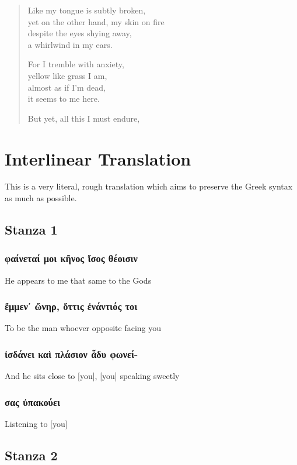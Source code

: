 \begin{multicols}{2}
\begin{verse}
  Like my tongue is subtly broken, \\
  yet on the other hand, my skin on fire \\
  despite the eyes shying away, \\
  a whirlwind in my ears. \\
  \medskip

  For I tremble with anxiety, \\
  yellow like grass I am, \\
  almost as if I'm dead, \\
  it seems to me here. \\
  \medskip

  But yet, all this I must endure,

\end{verse}
\end{multicols}
\clearpage
\section*{Interlinear Translation}
This is a very literal, rough translation which aims to preserve the Greek syntax as much as possible.

\subsection*{Stanza 1}
\subsubsection*{φαίνεταί μοι κῆνος ἴσος θέοισιν}
He appears to me that same to the Gods

\subsubsection*{ἔμμεν᾽ ὤνηρ, ὄττις ἐνάντιός τοι}
To be the man whoever opposite facing you

\subsubsection*{ἰσδάνει καὶ πλάσιον ἆδυ φωνεί-}
And he sits close to [you], [you] speaking sweetly

\subsubsection*{σας ὐπακούει}
Listening to [you]

\subsection*{Stanza 2}

